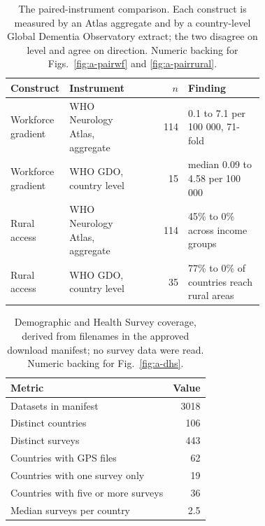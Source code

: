 \documentclass[9pt,twoside]{pnas-new}
\begin{document}
\begin{table}[!ht]
\centering
\caption{The paired-instrument comparison. Each construct is measured by an Atlas aggregate and by a country-level Global Dementia Observatory extract; the two disagree on level and agree on direction. Numeric backing for Figs.~\ref{fig:a-pairwf} and \ref{fig:a-pairrural}.}
\label{tab:a-paired}
\footnotesize
\begin{tabular}{p{0.20\linewidth}p{0.22\linewidth}rp{0.30\linewidth}}
\toprule
Construct & Instrument & $n$ & Finding \\
\midrule
Workforce gradient & WHO Neurology Atlas, aggregate & 114 & 0.1 to 7.1 per 100 000, 71-fold \\
Workforce gradient & WHO GDO, country level & 15 & median 0.09 to 4.58 per 100 000 \\
Rural access & WHO Neurology Atlas, aggregate & 114 & 45\% to 0\% across income groups \\
Rural access & WHO GDO, country level & 35 & 77\% to 0\% of countries reach rural areas \\
\bottomrule
\end{tabular}
\end{table}

\begin{table}[!ht]
\centering
\caption{Demographic and Health Survey coverage, derived from filenames in the approved download manifest; no survey data were read. Numeric backing for Fig.~\ref{fig:a-dhs}.}
\label{tab:a-dhs}
\small
\begin{tabular}{lr}
\toprule
Metric & Value \\
\midrule
Datasets in manifest & 3018 \\
Distinct countries & 106 \\
Distinct surveys & 443 \\
Countries with GPS files & 62 \\
Countries with one survey only & 19 \\
Countries with five or more surveys & 36 \\
Median surveys per country & 2.5 \\
\bottomrule
\end{tabular}
\end{table}
\end{document}
